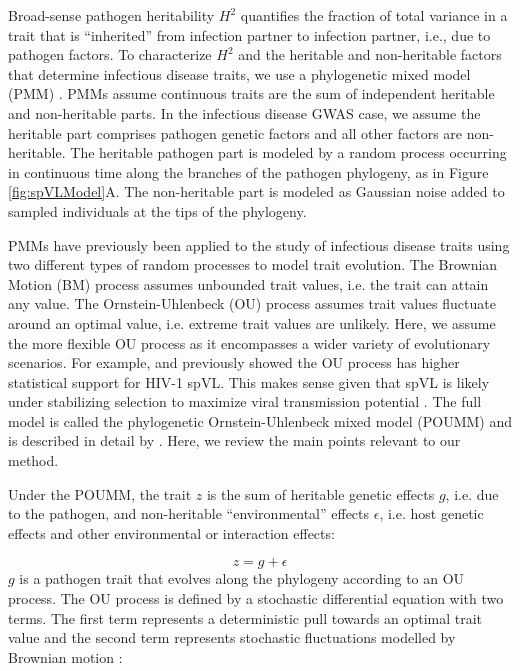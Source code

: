 \documentclass[11pt]{article}
\begin{document}
\begin{linenumbers}
Broad-sense pathogen heritability $H^2$ quantifies the fraction of total variance in a trait that is ``inherited'' from infection partner to infection partner, i.e., due to pathogen factors. To characterize $H^2$ and the heritable and non-heritable factors that determine infectious disease traits, we use a phylogenetic mixed model (PMM) \citep{Housworth2004}. PMMs assume continuous traits are the sum of independent heritable and non-heritable parts. In the infectious disease GWAS case, we assume the heritable part comprises pathogen genetic factors and all other factors are non-heritable. The heritable pathogen part is modeled by a random process occurring in continuous time along the branches of the pathogen phylogeny, as in Figure \ref{fig:spVLModel}A. The non-heritable part is modeled as Gaussian noise added to sampled individuals at the tips of the phylogeny.

PMMs have previously been applied to the study of infectious disease traits using two different types of random processes to model trait evolution. The Brownian Motion (BM) process assumes unbounded trait values, i.e. the trait can attain any value. The Ornstein-Uhlenbeck (OU) process assumes trait values fluctuate around an optimal value, i.e. extreme trait values are unlikely. Here, we assume the more flexible OU process as it encompasses a wider variety of evolutionary scenarios. For example, \citet{Mitov2018} and \citet{Bertels2018} previously showed the OU process has higher statistical support for HIV-1 spVL. This makes sense given that spVL is likely under stabilizing selection to maximize viral transmission potential \citep{Fraser2014}. The full model is called the phylogenetic Ornstein-Uhlenbeck mixed model (POUMM) and is described in detail by \citet{Mitov2018}. Here, we review the main points relevant to our method.

Under the POUMM, the trait $z$ is the sum of heritable genetic effects $g$, i.e. due to the pathogen, and non-heritable ``environmental'' effects $\epsilon$, i.e. host genetic effects and other environmental or interaction effects: 

\begin{equation}
    z = g + \epsilon
\end{equation}
$g$ is a pathogen trait that evolves along the phylogeny according to an OU process. The OU process is defined by a stochastic differential equation with two terms. The first term represents a deterministic pull towards an optimal trait value and the second term represents stochastic fluctuations modelled by Brownian motion \citep{Butler2004}:


\end{linenumbers}
\end{document}
